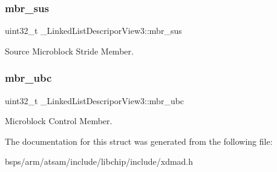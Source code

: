 \subsubsection{\texorpdfstring{mbr\_sus}{mbr\_sus}}
{\footnotesize\ttfamily uint32\+\_\+t \+\_\+\+Linked\+List\+Descripor\+View3\+::mbr\+\_\+sus}

Source Microblock Stride Member. \mbox{\label{struct__LinkedListDescriporView3_ae66959e325f6cfd8b3f2c73391d66321}} 
\subsubsection{\texorpdfstring{mbr\_ubc}{mbr\_ubc}}
{\footnotesize\ttfamily uint32\+\_\+t \+\_\+\+Linked\+List\+Descripor\+View3\+::mbr\+\_\+ubc}

Microblock Control Member. 

The documentation for this struct was generated from the following file\+:\begin{DoxyCompactItemize}
\item 
bsps/arm/atsam/include/libchip/include/xdmad.\+h\end{DoxyCompactItemize}
